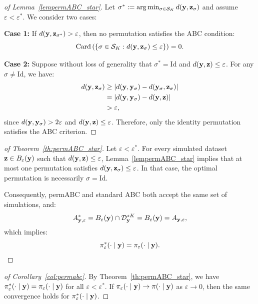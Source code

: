 \begin{proof}[of Lemma~\ref{lempermABC_star}]
Let $\sigma^* := \arg\min_{\sigma \in \mathcal{S}_K} d(\mathbf{y}, \mathbf{z}_{\sigma})$ and assume $\varepsilon < \varepsilon^*$. We consider two cases:

\textbf{Case 1:} If $d(\mathbf{y}, \mathbf{z}_{\sigma^*}) > \varepsilon$, then no permutation satisfies the ABC condition:
\[
\mathrm{Card} \left( \left\{ \sigma \in \mathcal{S}_K : d(\mathbf{y}, \mathbf{z}_{\sigma}) \leq \varepsilon \right\} \right) = 0.
\]

\textbf{Case 2:} Suppose without loss of generality that $\sigma^* = \mathrm{Id}$ and $d(\mathbf{y}, \mathbf{z}) \leq \varepsilon$. For any $\sigma \neq \mathrm{Id}$, we have:
\[
\begin{aligned}
d(\mathbf{y}, \mathbf{z}_{\sigma}) 
&\geq \left| d(\mathbf{y}, \mathbf{y}_{\sigma}) - d(\mathbf{y}_{\sigma}, \mathbf{z}_{\sigma}) \right| \\
&= \left| d(\mathbf{y}, \mathbf{y}_{\sigma}) - d(\mathbf{y}, \mathbf{z}) \right| \\
&> \varepsilon,
\end{aligned}
\]
since $d(\mathbf{y}, \mathbf{y}_{\sigma}) > 2\varepsilon$ and $d(\mathbf{y}, \mathbf{z}) \leq \varepsilon$. Therefore, only the identity permutation satisfies the ABC criterion.
\end{proof}

\medskip

\begin{proof}[of Theorem~\ref{th:permABC_star}]
Let $\varepsilon < \varepsilon^*$. For every simulated dataset $\mathbf{z} \in B_\varepsilon(\mathbf{y})$ such that $d(\mathbf{y}, \mathbf{z}) \leq \varepsilon$, Lemma~\ref{lempermABC_star} implies that at most one permutation satisfies $d(\mathbf{y}, \mathbf{z}_{\sigma}) \leq \varepsilon$. In that case, the optimal permutation is necessarily $\sigma = \mathrm{Id}$.

Consequently, permABC and standard ABC both accept the same set of simulations, and:
\[
A^*_{\mathbf{y},\varepsilon} = B_{\varepsilon}(\mathbf{y}) \cap \mathcal{D}_{\mathbf{y}}^{*K} = B_{\varepsilon}(\mathbf{y}) = A_{\mathbf{y},\varepsilon},
\]
which implies:
\[
\pi^*_{\varepsilon}(\cdot \mid \mathbf{y}) = \pi_{\varepsilon}(\cdot \mid \mathbf{y}).
\]


\end{proof}

\medskip

\begin{proof}[of Corollary~\ref{col:permabc}]
By Theorem~\ref{th:permABC_star}, we have $\pi^*_{\varepsilon}(\cdot \mid \mathbf{y}) = \pi_{\varepsilon}(\cdot \mid \mathbf{y})$ for all $\varepsilon < \varepsilon^*$. If $\pi_{\varepsilon}(\cdot \mid \mathbf{y}) \to \pi(\cdot \mid \mathbf{y})$ as $\varepsilon \to 0$, then the same convergence holds for $\pi^*_{\varepsilon}(\cdot \mid \mathbf{y})$.
\end{proof}



